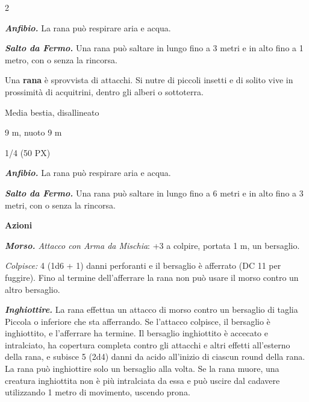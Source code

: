 \begin{multicols}{2}
{\emph{\textbf{Anfibio.}} La rana può respirare aria e acqua.

\emph{\textbf{Salto da Fermo.}} Una rana può saltare in lungo fino a 3 metri e in alto fino a 1 metro, con o senza la rincorsa.

Una \textbf{rana} è sprovvista di attacchi. Si nutre di piccoli insetti e di solito vive in prossimità di acquitrini, dentro gli alberi o sottoterra.

\begin{description}[noitemsep, topsep=0pt, parsep=0pt, partopsep=0pt, itemsep=1pt, leftmargin=2.35cm,  labelwidth=2.2cm, itemindent=0cm, listparindent=0pt] %
\setlength{\baselineskip}{10pt}
\item[\textbf{Taglia/Tipo}] Media bestia, disallineato
\item[\textbf{Caratt.}] 
\item[\textbf{Punti Ferita}] 
\item[\textbf{Tiri Salvez.}] 
\item[\textbf{Movimento}] 9 m, nuoto 9 m
\item[\textbf{Sfida}] 1/4 (50 PX)
\end{description}
\smallskip

\emph{\textbf{Anfibio.}} La rana può respirare aria e acqua.

\emph{\textbf{Salto da Fermo.}} Una rana può saltare in lungo fino a 6 metri e in alto fino a 3 metri, con o senza la rincorsa.

\textbf{Azioni}

\emph{\textbf{Morso.} Attacco con Arma da Mischia}: +3 a colpire, portata 1 m, un bersaglio.

\emph{Colpisce:} 4 (1d6 + 1) danni perforanti e il bersaglio è afferrato (DC 11 per fuggire). Fino al termine dell'afferrare la rana non può usare il morso contro un altro bersaglio.

\emph{\textbf{Inghiottire.}} La rana effettua un attacco di morso contro un bersaglio di taglia Piccola o inferiore che sta afferrando. Se l'attacco colpisce, il bersaglio è inghiottito, e l'afferrare ha termine. Il bersaglio inghiottito è accecato e intralciato, ha copertura completa contro gli attacchi e altri effetti all'esterno della rana, e subisce 5 (2d4) danni da acido all'inizio di ciascun round della rana. La rana può inghiottire solo un bersaglio alla volta. Se la rana muore, una creatura inghiottita non è più intralciata da essa e può uscire dal cadavere utilizzando 1 metro di movimento, uscendo prona.

}
\end{multicols}
